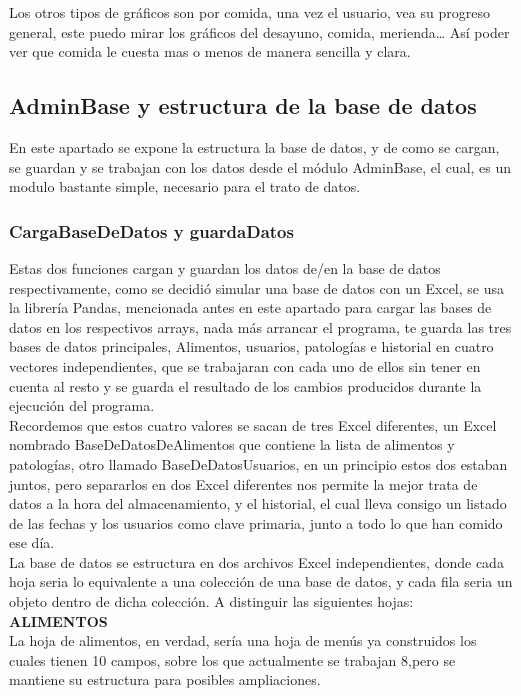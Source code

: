 Los otros tipos de gráficos son por comida, una vez el usuario, vea su progreso general, este puedo mirar los gráficos del desayuno, comida, merienda… Así poder ver que comida le cuesta mas o menos de manera sencilla y clara.\\

\subsection{AdminBase y estructura de la base de datos}
En este apartado se expone la estructura la base de datos, y de como se cargan, se guardan y se trabajan con los datos desde el módulo AdminBase, el cual, es un modulo bastante simple, necesario para el trato de datos.
\subsubsection{CargaBaseDeDatos y guardaDatos}
Estas dos funciones cargan y guardan los datos de/en la base de datos respectivamente, como se decidió simular una base de datos con un Excel, se usa la librería Pandas, mencionada antes en este apartado para cargar las bases de datos en los respectivos arrays, nada más arrancar el programa, te guarda las tres bases de datos principales, Alimentos, usuarios, patologías e historial en cuatro vectores independientes, que se trabajaran con cada uno de ellos sin tener en cuenta al resto y se guarda el resultado de los cambios producidos durante la ejecución del programa. \\

Recordemos que estos cuatro valores se sacan de tres Excel diferentes, un Excel nombrado BaseDeDatosDeAlimentos que contiene la lista de alimentos y patologías, otro llamado BaseDeDatosUsuarios, en un principio estos dos estaban juntos, pero separarlos en dos Excel diferentes nos permite la mejor trata de datos a la hora del almacenamiento, y el historial, el cual lleva consigo un listado de las fechas y los usuarios como clave primaria, junto a todo lo que han comido ese día.\\

La base de datos se estructura en dos archivos Excel independientes, donde cada hoja seria lo equivalente a una colección de una base de datos, y cada fila seria un objeto dentro de dicha colección. A distinguir las siguientes hojas:\\

\textbf{\textsc{ALIMENTOS}}\\
La hoja de alimentos, en verdad, sería una hoja de menús ya construidos los cuales tienen 10 campos, sobre los que actualmente se trabajan 8,pero se mantiene su estructura para posibles ampliaciones.\\

